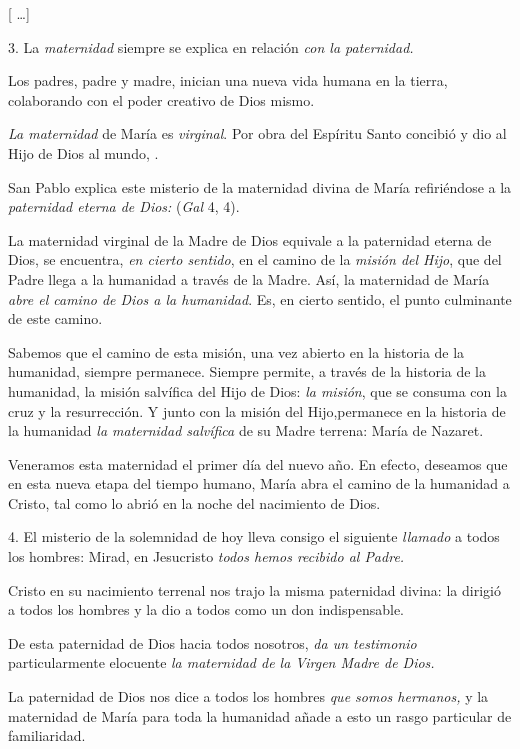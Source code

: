 \begin{body}
	{[} \ldots{}{]}
	
	3. La \emph{maternidad} siempre se explica en relación \emph{con la 	paternidad.}
	
	Los padres, padre y madre, inician una nueva vida humana en la tierra, colaborando con el poder creativo de Dios mismo.
	
	\emph{La maternidad} de María es \emph{virginal}. Por obra del Espíritu Santo concibió y dio al Hijo de Dios al mundo, .
	
	San Pablo explica este misterio de la maternidad divina de María refiriéndose a la \emph{paternidad eterna de Dios:}  (\emph{Gal} 4, 4).
	
	La maternidad virginal de la Madre de Dios equivale a la paternidad eterna de Dios, se encuentra, \emph{en cierto sentido}, en el camino de la \emph{misión del Hijo}, que del Padre llega a la humanidad a través de la Madre. Así, la maternidad de María \emph{abre el camino de Dios a 	la humanidad}. Es, en cierto sentido, el punto culminante de este camino.
	
	Sabemos que el camino de esta misión, una vez abierto en la historia de la humanidad, siempre permanece. Siempre permite, a través de la historia de la humanidad, la misión salvífica del Hijo de Dios: \emph{la 	misión}, que se consuma con la cruz y la resurrección. Y junto con la misión del Hijo,permanece en la historia de la humanidad \emph{la 	maternidad salvífica} de su Madre terrena: María de Nazaret.
	
	Veneramos esta maternidad el primer día del nuevo año. En efecto, deseamos que en esta nueva etapa del tiempo humano, María abra el camino de la humanidad a Cristo, tal como lo abrió en la noche del nacimiento de Dios.
	
	4. El misterio de la solemnidad de hoy lleva consigo el siguiente \emph{llamado} a todos los hombres: Mirad, en Jesucristo \emph{todos 	hemos recibido al Padre.}
	
	Cristo en su nacimiento terrenal nos trajo la misma paternidad divina: la dirigió a todos los hombres y la dio a todos como un don indispensable.
	
	De esta paternidad de Dios hacia todos nosotros, \emph{da un testimonio} particularmente elocuente \emph{la maternidad de la Virgen Madre de 	Dios.}
	
	La paternidad de Dios nos dice a todos los hombres \emph{que somos 	hermanos,} y la maternidad de María para toda la humanidad añade a esto un rasgo particular de familiaridad.
	

\end{body}
